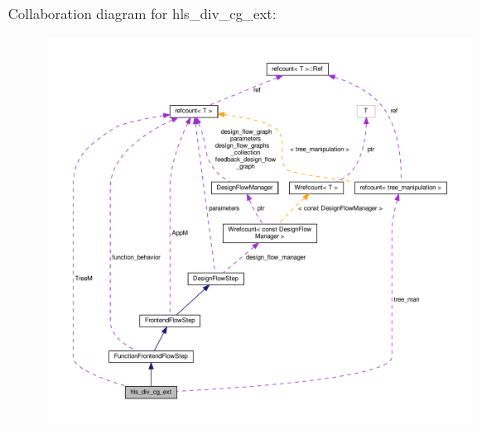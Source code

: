 Collaboration diagram for hls\+\_\+div\+\_\+cg\+\_\+ext\+:
\nopagebreak
\begin{figure}[H]
\begin{center}
\leavevmode
\includegraphics[width=350pt]{d9/dbb/classhls__div__cg__ext__coll__graph}
\end{center}
\end{figure}

